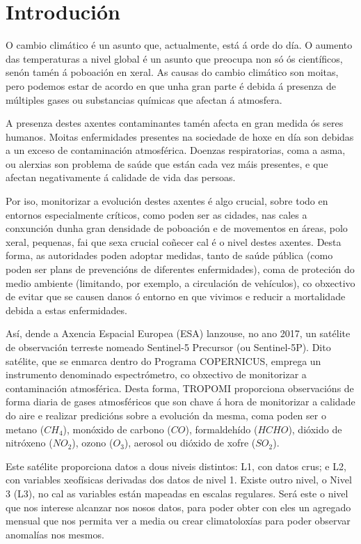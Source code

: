\chapter{Introdución}\label{introducion}

O cambio climático é un asunto que, actualmente, está á orde do día. O aumento das temperaturas a nivel global é un asunto que preocupa non só ós
científicos, senón tamén á poboación en xeral. As causas do cambio climático son moitas, pero podemos estar de acordo en que unha gran parte é
debida á presenza de múltiples gases ou substancias químicas que afectan á atmosfera.

A presenza destes axentes contaminantes tamén afecta en gran medida ós seres humanos. Moitas enfermidades presentes na sociedade de hoxe en día son debidas
a un exceso de contaminación atmosférica. Doenzas respiratorias, coma a asma, ou alerxias son problema de saúde que están cada vez máis presentes, e que afectan
negativamente á calidade de vida das persoas.

Por iso, monitorizar a evolución destes axentes é algo crucial, sobre todo en entornos especialmente críticos, como poden ser as cidades, nas cales a conxunción
dunha gran densidade de poboación e de movementos en áreas, polo xeral, pequenas, fai que sexa crucial coñecer cal é o nivel destes axentes. Desta forma, as
autoridades poden adoptar medidas, tanto de saúde pública (como poden ser plans de prevencións de diferentes enfermidades), coma de proteción do medio ambiente
(limitando, por exemplo, a circulación de vehículos), co obxectivo de evitar que se causen danos ó entorno en que vivimos e reducir a mortalidade debida a
estas enfermidades.

Así, dende a Axencia Espacial Europea (ESA) lanzouse, no ano 2017, un satélite de observación terreste nomeado Sentinel-5 Precursor (ou Sentinel-5P).
Dito satélite, que se enmarca dentro do Programa COPERNICUS, emprega un instrumento denominado espectrómetro, co obxectivo de monitorizar a contaminación
atmosférica. Desta forma, TROPOMI proporciona observacións de forma diaria de gases atmosféricos que son chave á hora de monitorizar a calidade do aire
e realizar predicións sobre a evolución da mesma, coma poden ser o metano ($CH_{4}$), monóxido de carbono ($CO$), formaldehído ($HCHO$), dióxido de nitróxeno
($NO_{2}$), ozono ($O_{3}$), aerosol ou dióxido de xofre ($SO_{2}$).

Este satélite proporciona datos a dous niveis distintos: L1, con datos crus; e L2, con variables xeofísicas derivadas dos datos de nivel 1. Existe outro nivel,
o Nivel 3 (L3), no cal as variables están mapeadas en escalas regulares. Será este o nivel que nos interese alcanzar nos nosos datos, para poder obter con eles
un agregado mensual que nos permita ver a media ou crear climatoloxías para poder observar anomalías nos mesmos.

